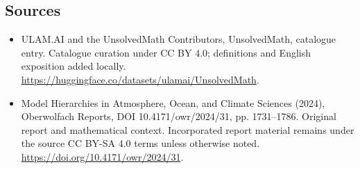 \documentclass[11pt]{article}
\begin{document}
\subsection{Sources}
\begin{itemize}
\item[\hypertarget{source:statement:1}{S1}] ULAM.AI and the UnsolvedMath Contributors, UnsolvedMath, catalogue entry. Catalogue curation under CC BY 4.0; definitions and English exposition added locally.
\url{https://huggingface.co/datasets/ulamai/UnsolvedMath}.
\item[\hypertarget{source:statement:2}{S2}] Model Hierarchies in Atmosphere, Ocean, and Climate Sciences (2024), Oberwolfach Reports, DOI 10.4171/owr/2024/31, pp. 1731--1786. Original report and mathematical context. Incorporated report material remains under the source CC BY-SA 4.0 terms unless otherwise noted.
\url{https://doi.org/10.4171/owr/2024/31}.
\end{itemize}
\label{end:statement}
\end{document}
